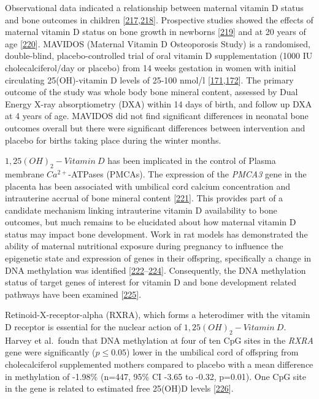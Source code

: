 \documentclass[
]{book}
\begin{document}
Observational data indicated a relationship between maternal vitamin D status and bone outcomes in children
{[}\protect\hyperlink{ref-Mahon2010a}{217},\protect\hyperlink{ref-Viljakainen2010}{218}{]}.
Prospective studies showed the effects of maternal vitamin D status on bone growth in newborns {[}\protect\hyperlink{ref-Viljakainen2011}{219}{]} and at 20 years of age {[}\protect\hyperlink{ref-Zhu2014a}{220}{]}.
MAVIDOS (Maternal Vitamin D Osteoporosis Study) is a randomised, double-blind, placebo-controlled trial of oral vitamin D supplementation (1000 IU cholecalciferol/day or placebo) from 14 weeks gestation in women with initial circulating 25(OH)-vitamin D levels of 25-100 nmol/l {[}\protect\hyperlink{ref-Harvey2012a}{171},\protect\hyperlink{ref-Cooper2016}{172}{]}.
The primary outcome of the study was whole body bone mineral content, assessed by Dual Energy X-ray absorptiometry (DXA) within 14 days of birth, and follow up DXA at 4 years of age.
MAVIDOS did not find significant differences in neonatal bone outcomes overall but there were significant differences between intervention and placebo for births taking place during the winter months.

\(1,25(OH)_2-Vitamin~D\) has been implicated in the control of Plasma membrane \(Ca^{2+}\)-ATPases (PMCAs).
The expression of the \emph{PMCA3} gene in the placenta has been associated with umbilical cord calcium concentration and intrauterine accrual of bone mineral content {[}\protect\hyperlink{ref-Kip2004}{221}{]}.
This provides part of a candidate mechanism linking intrauterine vitamin D availability to bone outcomes, but much remains to be elucidated about how maternal vitamin D status may impact bone development.
Work in rat models has demonstrated the ability of maternal nutritional exposure during pregnancy to influence the epigenetic state and expression of genes in their offspring, specifically a change in DNA methylation was identified {[}\protect\hyperlink{ref-Burdge2007a}{222}--\protect\hyperlink{ref-Burdge2007}{224}{]}.
Consequently, the DNA methylation status of target genes of interest for vitamin D and bone development related pathways have been examined {[}\protect\hyperlink{ref-Holroyd2012}{225}{]}.

Retinoid-X-receptor-alpha (RXRA), which forms a heterodimer with the vitamin D receptor is essential for the nuclear action of \(1,25(OH)_2-Vitamin~D\).
Harvey et al.~foudn that DNA methylation at four of ten CpG sites in the \emph{RXRA} gene were significantly (\(p\le0.05\)) lower in the umbilical cord of offspring from cholecalciferol supplemented mothers compared to placebo with a mean difference in methylation of -1.98\% (n=447, 95\% CI -3.65 to -0.32, p=0.01).
One CpG site in the gene is related to estimated free 25(OH)D levels {[}\protect\hyperlink{ref-Harvey2014d}{226}{]}.
\end{document}
